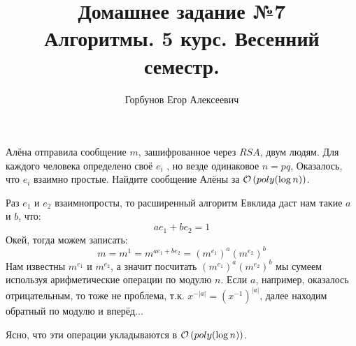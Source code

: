 
\title{Домашнее задание №7 \\ Алгоритмы. 5 курс. Весенний семестр.}
\author{Горбунов Егор Алексеевич}


\maketitle

\begin{task}[1]
Алёна отправила сообщение $m$, зашифрованное через $RSA$, двум людям. Для каждого
человека определено своё $e_i$ , но везде одинаковое $n = pq$, Оказалось, что $e_i$ взаимно
простые. Найдите сообщение Алёны за $\mathcal{O}\left(poly(\log n)\right)$.
\end{task}

\begin{solution}
Раз $e_1$ и $e_2$ взаимнопросты, то расширенный алгоритм Евклида даст нам такие $a$ и $b$, что:
\[
	ae_1 + be_2 = 1
\]
Окей, тогда можем записать:
\[
	m = m^1 = m^{ae_1+be_2} = (m^{e_1})^a (m^{e_2})^b
\]
Нам известны $m^{e_1}$ и $m^{e_2}$, а значит посчитать $(m^{e_1})^a (m^{e_2})^b$ мы сумеем используя арифметические операции по модулю $n$. Если $a$, например, оказалось отрицательным, то тоже не проблема,
т.к. $x^{-|a|} = (x^{-1})^{|a|}$, далее находим обратный по модулю и вперёд...

Ясно, что эти операции укладываются в $\mathcal{O}\left(poly(\log n)\right)$. \xqed
\end{solution}

